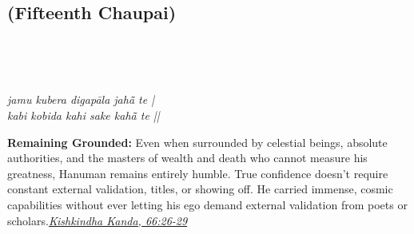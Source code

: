 
\newpage

\subsection*{ (Fifteenth Chaupai)}

\begin{minipage}[t]{0.55\textwidth}
\vspace{0pt}

{\large \linespread{1.5}\selectfont
{}\\
\par}

\vspace{0.5em}

{\large \linespread{1.5}\selectfont
{}\\
\par}

\vspace{0.5em}

{\large \linespread{1.3}\selectfont
\textit{jamu kubera digapāla jahā̃ te |}\\
\textit{kabi kobida kahi sake kahā̃ te ||}
\par}
\end{minipage}%
\hfill
\begin{minipage}[t]{0.42\textwidth}
\vspace{0pt}
\begin{tcolorbox}[anchorbox]
\textbf{Remaining Grounded:} Even when surrounded by celestial beings, absolute authorities, and the masters of wealth and death who cannot measure his greatness, Hanuman remains entirely humble. True confidence doesn't require constant external validation, titles, or showing off.
\vspace{0.5em}\newline He carried immense, cosmic capabilities without ever letting his ego demand external validation from poets or scholars.\newline\null\hfill\href{https://www.valmiki.iitk.ac.in/sloka?field_kanda_tid=4&language=dv&field_sarga_value=66}{\textit{Kishkindha Kanda, 66:26-29}}
\end{tcolorbox}
\end{minipage}

